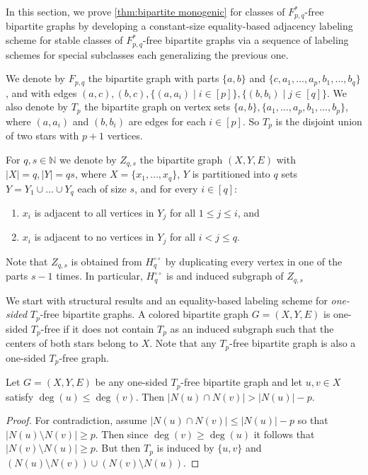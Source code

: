 \documentclass{theoretics}
\newcommand{\bN}{\ensuremath{\mathbb{N}}}
\begin{document}
In this section, we prove \cref{thm:bipartite monogenic} for classes of $F^*_{p,q}$-free bipartite
graphs by developing a constant-size equality-based adjacency labeling scheme for stable classes of
$F^*_{p,q}$-free bipartite graphs via a sequence of labeling schemes for special subclasses each
generalizing the previous one.

We denote by $F_{p,q}$ the bipartite graph with parts $\{a,b\}$ and $\{c, a_1, \dotsc, a_p, b_1,
\dotsc, b_q\}$, and with edges $(a,c), (b,c), \{(a,a_i) \mid i \in [p] \}, \{(b,b_i) \mid j \in
[q]\}$.  We also denote by $T_p$ the bipartite graph on vertex sets $\{a,b\}, \{a_1, \dotsc, a_p,
b_1, \dotsc, b_p\}$, where $(a,a_i)$ and $(b,b_i)$ are edges for each $i \in [p]$. So $T_p$ is the
disjoint union of two stars with $p+1$ vertices.

\begin{definition}
For $q,s \in \bN$ we denote by $Z_{q,s}$ the bipartite graph $(X,Y,E)$ with 
$|X|=q, |Y|=qs$, where $X = \{x_1, \ldots, x_q \}$, $Y$ is partitioned into $q$
sets $Y = Y_1 \cup \ldots \cup Y_q$ each of size $s$, and for every $i \in [q]$:
\begin{enumerate}[label=\textup{(\arabic*)}]
\item $x_i$ is adjacent to all vertices in $Y_j$ for all $1 \leq j \leq i$, and
\item $x_i$ is adjacent to no vertices in $Y_j$ for all $i < j \leq q$.
\end{enumerate}
\end{definition}
\noindent
Note that $Z_{q,s}$ is obtained from $H^{\circ\circ}_q$ by duplicating every vertex in one of the parts $s-1$ times. In particular, $H^{\circ\circ}_q$ is and induced subgraph of $Z_{q,s}$

\medskip
\noindent
We start with structural results and an equality-based labeling scheme for \emph{one-sided} $T_p$-free bipartite graphs.
A colored bipartite graph $G = (X,Y,E)$ is one-sided $T_p$-free if it does not contain $T_p$
as an induced subgraph such that the centers of both stars belong to $X$. Note that
any $T_p$-free bipartite graph is also a one-sided $T_p$-free graph.

\begin{proposition}
\label{prop:degree order}
Let $G = (X,Y,E)$ be any one-sided $T_p$-free bipartite graph and let $u,v \in X$ satisfy $\deg(u) \leq
\deg(v)$. Then $|N(u) \cap N(v)| > |N(u)|-p$.
\end{proposition}
\begin{proof}
For contradiction, assume $|N(u) \cap N(v)| \leq |N(u)|-p$ so that $|N(u) \setminus N(v)| \geq p$.
Then since $\deg(v) \geq \deg(u)$ it follows that $|N(v) \setminus N(u)| \geq p$. But then $T_p$ is
induced by $\{u,v\}$ and $(N(u)\setminus N(v)) \cup (N(v) \setminus N(u))$.
\end{proof}
\end{document}
